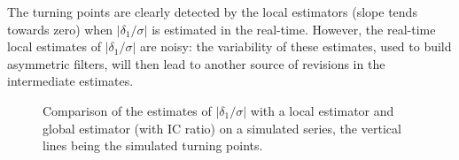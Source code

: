 \documentclass[
]{article}
\newcommand\1{\mathds{1}}
\begin{document}
The turning points are clearly detected by the local estimators (slope
tends towards zero) when \(|\delta_1/\sigma|\) is estimated in the
real-time. However, the real-time local estimates of
\(|\delta_1/\sigma|\) are noisy: the variability of these estimates,
used to build asymmetric filters, will then lead to another source of
revisions in the intermediate estimates.

\begin{figure}[H]

\caption{\label{fig-mmpenteconcac-ex}Comparison of the estimates of
\(|\delta_1/\sigma|\) with a local estimator and global estimator (with
IC ratio) on a simulated series, the vertical lines being the simulated
turning points.}

\begin{minipage}{\linewidth}



\end{minipage}%
\newline
\begin{minipage}{\linewidth}



\end{minipage}%

\end{figure}%
\end{document}
